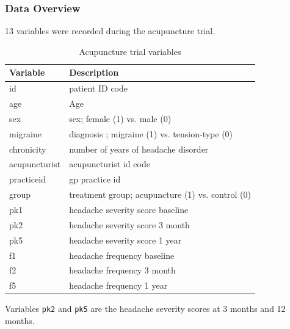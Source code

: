 \documentclass{article}
\begin{document}
\subsubsection{Data Overview}\label{data-overview}

13 variables were recorded during the acupuncture trial.

\begin{table}[H]
\centering
\caption{Acupuncture trial variables}
\label{}

\begin{tabular}{ll}
\toprule
Variable & Description\\
\midrule
id & patient ID code\\
age & Age\\
sex & sex; female (1) vs. male (0)\\
migraine & diagnosis ; migraine (1) vs. tension-type (0)\\
chronicity & number of years of headache disorder\\
\addlinespace
acupuncturist & acupuncturist id code\\
practiceid & gp practice id\\
group & treatment group; acupuncture (1) vs. control (0)\\
pk1 & headache severity score baseline\\
pk2 & headache severity score 3 month\\
\addlinespace
pk5 & headache severity score 1 year\\
f1 & headache frequency baseline\\
f2 & headache frequency 3 month\\
f5 & headache frequency 1 year\\
\bottomrule
\end{tabular}
\end{table}

Variables \texttt{pk2} and \texttt{pk5} are the headache severity scores
at 3 months and 12 months.
\end{document}
